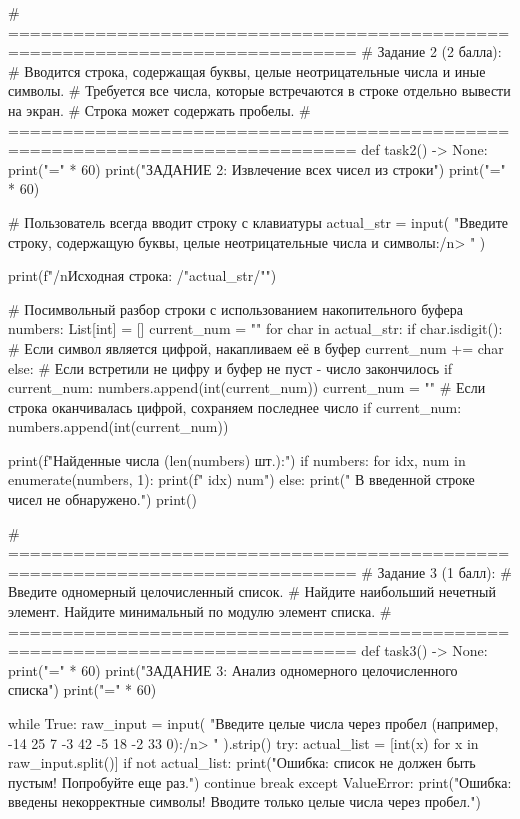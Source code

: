 \documentclass[14pt,a4paper]{extarticle}
\begin{document}
\begin{CodeListing}
# ==============================================================================
# Задание 2 (2 балла):
# Вводится строка, содержащая буквы, целые неотрицательные числа и иные символы.
# Требуется все числа, которые встречаются в строке отдельно вывести на экран.
# Строка может содержать пробелы.
# ==============================================================================
def task2() -> None:
    print("=" * 60)
    print("ЗАДАНИЕ 2: Извлечение всех чисел из строки")
    print("=" * 60)

    # Пользователь всегда вводит строку с клавиатуры
    actual_str = input(
        "Введите строку, содержащую буквы, целые неотрицательные числа и символы:/n> "
    )

    print(f"/nИсходная строка: /"{actual_str}/"")

    # Посимвольный разбор строки с использованием накопительного буфера
    numbers: List[int] = []
    current_num = ""
    for char in actual_str:
        if char.isdigit():
            # Если символ является цифрой, накапливаем её в буфер
            current_num += char
        else:
            # Если встретили не цифру и буфер не пуст - число закончилось
            if current_num:
                numbers.append(int(current_num))
                current_num = ""
    # Если строка оканчивалась цифрой, сохраняем последнее число
    if current_num:
        numbers.append(int(current_num))

    print(f"Найденные числа ({len(numbers)} шт.):")
    if numbers:
        for idx, num in enumerate(numbers, 1):
            print(f"  {idx}) {num}")
    else:
        print("  В введенной строке чисел не обнаружено.")
    print()


# ==============================================================================
# Задание 3 (1 балл):
# Введите одномерный целочисленный список.
# Найдите наибольший нечетный элемент. Найдите минимальный по модулю элемент списка.
# ==============================================================================
def task3() -> None:
    print("=" * 60)
    print("ЗАДАНИЕ 3: Анализ одномерного целочисленного списка")
    print("=" * 60)

    while True:
        raw_input = input(
            "Введите целые числа через пробел (например, -14 25 7 -3 42 -5 18 -2 33 0):/n> "
        ).strip()
        try:
            actual_list = [int(x) for x in raw_input.split()]
            if not actual_list:
                print("Ошибка: список не должен быть пустым! Попробуйте еще раз.")
                continue
            break
        except ValueError:
            print("Ошибка: введены некорректные символы! Вводите только целые числа через пробел.")


\end{CodeListing}
\end{document}
